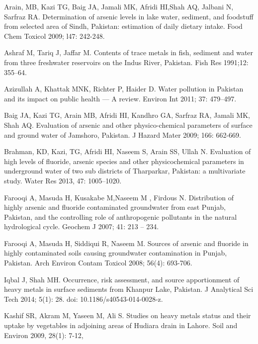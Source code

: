 \begin{thebibliography}

\bibitem{} \hangindent=1cm Arain, MB, Kazi TG, Baig JA, Jamali MK, Afridi HI,Shah AQ, Jalbani N, Sarfraz RA. Determination of arsenic levels in lake water, sediment, and foodstuff from selected area of Sindh, Pakistan: estimation of daily dietary intake. Food Chem Toxicol 2009; l47: 242-248.

\bibitem{} \hangindent=1cm Ashraf M, Tariq J, Jaffar M. Contents of trace metals in fish, sediment and water from three freshwater reservoirs on the Indus River, Pakistan. Fish Res 1991;12: 355–64.

\bibitem{} \hangindent=1cm Azizullah A, Khattak MNK, Richter P, Haider  D. Water pollution in Pakistan and its impact on public health — A review. Environ Int 2011; 37: 479–497.

\bibitem{} \hangindent=1cm Baig JA, Kazi TG, Arain MB, Afridi HI, Kandhro GA, Sarfraz RA, Jamali MK, Shah AQ.  Evaluation of arsenic and other physico-chemical parameters of surface and ground water of Jamshoro, Pakistan. J Hazard Mater 2009; 166: 662-669.

\bibitem{} \hangindent=1cm Brahman, KD, Kazi, TG, Afridi HI, Naseem S, Arain SS,  Ullah N. Evaluation of high levels of fluoride, arsenic species and other physicochemical parameters in underground water of two sub districts of Tharparkar, Pakistan: a multivariate study. Water Res 2013, 47: 1005–1020.

\bibitem{} \hangindent=1cm Farooqi A, Masuda H, Kusakabe M,Naseem M , Firdous N. Distribution of highly arsenic and fluoride contaminated groundwater from east Punjab, Pakistan, and the controlling role of anthropogenic pollutants in the natural hydrological cycle. Geochem J 2007; 41: 213 – 234.

\bibitem{} \hangindent=1cm Farooqi A, Masuda H, Siddiqui R, Naseem M. Sources of arsenic and fluoride in highly contaminated soils causing groundwater contamination in Punjab, Pakistan. Arch Environ Contam Toxicol 2008; 56(4): 693-706.

\bibitem{} \hangindent=1cm Iqbal J, Shah MH. Occurrence, risk assessment, and source apportionment of heavy metals in surface sediments from Khanpur Lake, Pakistan. J Analytical Sci Tech 2014; 5(1): 28. doi: 10.1186/s40543-014-0028-z.

\bibitem{} \hangindent=1cm Kashif SR, Akram M, Yaseen M, Ali S. Studies on heavy metals status and their uptake by vegetables in adjoining areas of Hudiara drain in Lahore. Soil and Environ 2009, 28(1): 7-12, 


\end{thebibliography}
